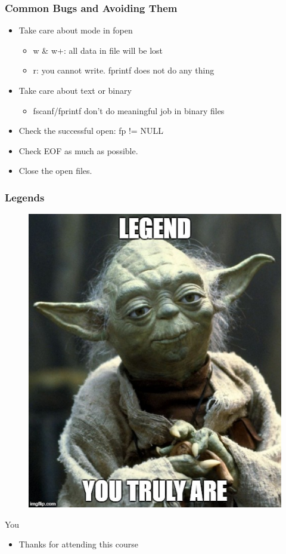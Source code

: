 \documentclass{../c-lecture}
\begin{document}
\begin{frame}
  \frametitle{Common Bugs and Avoiding Them}
  \begin{itemize}
    \item Take care about mode in fopen
    \begin{itemize}
      \item w \& w+: all data in file will be lost
      \item r: you cannot write. fprintf does not do any thing
    \end{itemize}
    \item Take care about text or binary
    \begin{itemize}
      \item fscanf/fprintf don’t do meaningful job in binary files
    \end{itemize}
    \item Check the successful open: fp != NULL
    \item Check EOF as much as possible.
    \item Close the open files.
  \end{itemize}
\end{frame}

\begin{frame}
  \frametitle{Legends}
  \begin{figure}
    \includegraphics[height=.75\textheight]{./img/yoda.jpg}
  \end{figure}
  \pause%
  \centering
  \color{Violet} You
\end{frame}
\begin{frame}
  \begin{itemize}
    \item Thanks for attending this course
  \end{itemize}
\end{frame}
\end{document}

